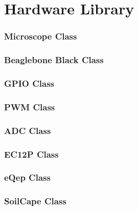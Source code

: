 \documentclass[11pt,fleqn,,a4paper,twoside,openright]{book}
\begin{document}
\chapter{Hardware Library}
\subsection{Microscope Class}


\newpage
\subsection{Beaglebone Black Class}


\newpage
\subsection{GPIO Class}


\newpage
\subsection{PWM Class}


\newpage
\subsection{ADC Class}


\newpage
\subsection{EC12P Class}


\newpage
\subsection{eQep Class}


\newpage
\subsection{SoilCape Class}


\newpage
\end{document}

